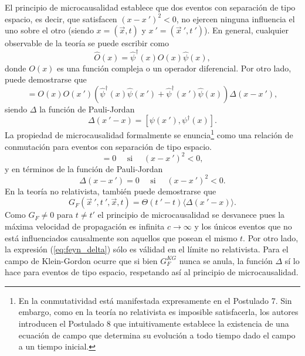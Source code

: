 El principio de microcausalidad establece que dos eventos con separación de tipo espacio, es decir, que satisfacen $(x-x\:')^2<0$, no ejercen ninguna influencia el uno sobre el otro (siendo $x=(\vec{x},t)$ y $x\:'=(\vec{x}\:',t\:')$). En general, cualquier observable de la teoría se puede escribir como \cite{Greiner:1996}
\begin{equation}
\hat{O}(x)=\hat{\psi}^{\dag}(x)O(x)\hat{\psi}(x),
\end{equation}
donde $O(x)$ es una función compleja o un operador diferencial. Por otro lado, puede demostrarse que
\begin{equation}
[\hat{O}(x),\hat{O}(x\:')]=O(x)O(x\:')\left(\hat{\psi}^{\dag}(x)\hat{\psi}(x\:')+\hat{\psi}^{\dag}(x\:')\hat{\psi}(x)\right)\Delta(x-x\:'),
\end{equation}
siendo $\Delta$ la función de Pauli-Jordan
\begin{equation}
\Delta(x\:'-x)=[ \psi(x\:'),\psi^{\dag}(x)].
\end{equation}
La propiedad de microcausalidad formalmente se enuncia\footnote{En \cite{Haag:1962} la conmutatividad está manifestada expresamente en el Postulado 7. Sin embargo, como en la teoría no relativista es imposible satisfacerla, los autores introducen el Postulado 8 que intuitivamente establece la existencia de una ecuación de campo que determina su evolución a todo tiempo dado el campo a un tiempo inicial.} como una relación de conmutación para eventos con separación de tipo espacio.
\begin{equation}
[\hat{O}(x),\hat{O}(x\:')]=0\:\:\:\:\:\:\text{si}\:\:\:\:\:\:(x-x\:')^2<0,
\end{equation}
y en términos de la función de Pauli-Jordan
\begin{equation}
\Delta(x-x\:')=0\:\:\:\:\:\:\text{si}\:\:\:\:\:\:(x-x\:')^2<0.
\end{equation}
En la teoría no relativista, también puede demostrarse que
\begin{equation}
G_F(\vec{x}\:',t\:',\vec{x},t)=\Theta (t\:'-t)\langle \Delta(x\:'-x)\rangle.
\label{eq:feyn_delta}
\end{equation}
Como $G_F\neq 0$ para $t\neq t'$ el principio de microcausalidad se desvanece pues la máxima velocidad de propagación es infinita $c\rightarrow \infty$ y los únicos eventos que no está influenciados causalmente son aquellos que posean el mismo $t$. Por otro lado, la expresión (\ref{eq:feyn_delta}) sólo es válidad en el límite no relativista. Para el campo de Klein-Gordon ocurre que si bien $G_F^{KG}$ nunca se anula, la función $\Delta$ sí lo hace para eventos de tipo espacio, respetando así al principio de microcausalidad.

